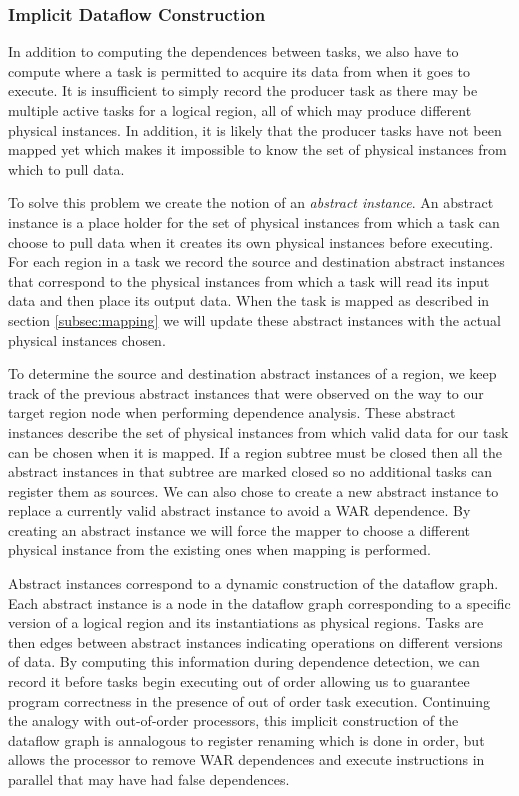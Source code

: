 \subsubsection{Implicit Dataflow Construction}
\label{subsec:dataflow}
In addition to computing the dependences between tasks, we also have to compute where
a task is permitted to acquire its data from when it goes to execute.
It is insufficient to simply record the producer task as there
may be multiple active tasks for a logical region, all of which may produce different physical
instances.  In addition, it is likely that the producer tasks have not been mapped
yet which makes it impossible to know the set of physical instances from which to pull data.

To solve this problem we create the notion of an {\em abstract instance}.  An abstract instance
is a place holder for the set of physical instances from which a task can choose to pull
data when it creates its own physical instances before executing.  For each region in
a task we record the source and destination abstract instances that correspond to the physical
instances from which a task will read its input data and then place its output data.
When the task is mapped as described in section \ref{subsec:mapping} we will update these
abstract instances with the actual physical instances chosen.

To determine the source and destination abstract instances of a region, we keep track of 
the previous abstract instances that were observed on the way to our target region node
when performing dependence analysis.  These abstract instances describe the set of physical
instances from which valid data for our task can be chosen when it is mapped.  If a region
subtree must be closed then all the abstract instances in that subtree are marked closed
so no additional tasks can register them as sources.  We can also chose to create a new
abstract instance to replace a currently valid abstract instance to avoid a WAR dependence.
By creating an abstract instance we will force the mapper to choose a different physical
instance from the existing ones when mapping is performed.

Abstract instances correspond to a dynamic construction of the dataflow graph.  Each abstract
instance is a node in the dataflow graph corresponding to a specific version of a logical 
region and its instantiations as physical regions.  Tasks are then edges between abstract
instances indicating operations on different versions of data.  By computing this information
during dependence detection, we can record it before tasks begin executing out of order allowing
us to guarantee program correctness in the presence of out of order task execution.  Continuing
the analogy with out-of-order processors, this implicit construction of the dataflow graph
is annalogous to register renaming which is done in order, but allows the processor to remove
WAR dependences and execute instructions in parallel that may have had false dependences.

